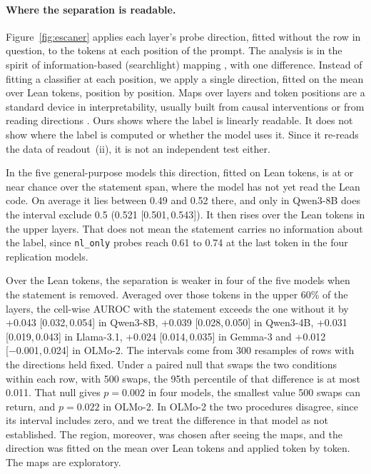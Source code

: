 \documentclass[10pt]{article}
\newcommand{\vr}[1]{\texttt{#1}}
\newcommand{\ic}[2]{[#1,\,#2]}
\begin{document}
\paragraph{Where the separation is readable.}
Figure~\ref{fig:escaner} applies each layer's probe direction, fitted without the row in question, to the tokens at
each position of the prompt. The analysis is in the spirit of information-based (searchlight) mapping
\citep{searchlight}, with one difference. Instead of fitting a classifier at each position, we apply a single
direction, fitted on the mean over Lean tokens, position by position. Maps over layers and token positions are a
standard device in interpretability, usually built from causal interventions \citep{meng2022rome,geometry} or from
reading directions \citep{zou2023repe}. Ours shows where the label is linearly readable. It does not show where the
label is computed or whether the model uses it. Since it re-reads the data of readout~(ii), it is not an
independent test either.

In the five general-purpose models this direction, fitted on Lean tokens, is at or near chance over the statement
span, where the model has not yet read the Lean code. On average it lies between 0.49 and 0.52 there, and only in Qwen3-8B does the interval exclude 0.5 (0.521
\ic{0.501}{0.543}). It then rises over the Lean tokens in the upper layers. That
does not mean the statement carries no information about the label, since \vr{nl\_only} probes reach 0.61 to 0.74 at the last token in the four replication models.

Over the Lean tokens, the separation is weaker in four of the five models when the statement is removed. Averaged over those tokens in
the upper 60\% of the layers, the cell-wise AUROC with the statement exceeds the one without it by +0.043
\ic{0.032}{0.054} in Qwen3-8B, +0.039 \ic{0.028}{0.050} in Qwen3-4B, +0.031 \ic{0.019}{0.043} in Llama-3.1, +0.024
\ic{0.014}{0.035} in Gemma-3 and +0.012 \ic{−0.001}{0.024} in OLMo-2. The intervals come from 300 resamples of rows
with the directions held fixed. Under a paired null that swaps the two conditions within each row, with 500 swaps,
the 95th percentile of that difference is at most 0.011. That null gives $p = 0.002$ in four models, the smallest
value 500 swaps can return, and $p = 0.022$ in OLMo-2. In OLMo-2 the two procedures disagree, since its interval
includes zero, and we treat the difference in that model as not established. The region, moreover, was chosen after
seeing the maps, and the direction was fitted on the mean over Lean tokens and applied token by token. The maps are
exploratory.
\end{document}
